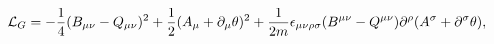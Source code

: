 \begin{equation}
\label{gauged-Lg} {\cal L}_G =
-\frac{1}{4}(B_{\mu\nu}-Q_{\mu\nu})^2+\frac{1}{2}
(A_\mu+\partial_\mu\theta)^2
+\frac{1}{2m}\epsilon_{\mu\nu\rho\sigma}(B^{\mu\nu}-Q^{\mu\nu})
\partial^\rho(A^\sigma+\partial^\sigma\theta),
\end{equation}

